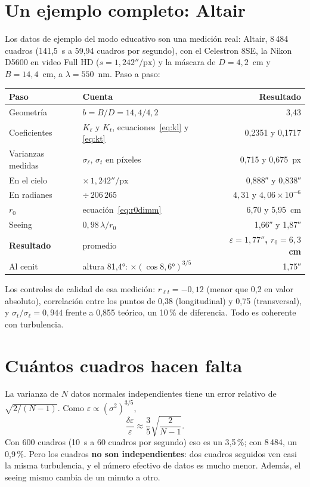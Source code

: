 \section{Un ejemplo completo: Altair}\label{sec:ejemplo_altair}

Los datos de ejemplo del modo educativo son una medición real: Altair, 8\,484 cuadros (141,5~s a 59,94 cuadros por
segundo), con el Celestron 8SE, la Nikon D5600 en video Full HD ($s = 1{,}242''/\text{px}$) y la máscara de
$D = 4{,}2$~cm y $B = 14{,}4$~cm, a $\lambda = 550$~nm. Paso a paso:

\begin{center}\small
\begin{tabular}{@{}l l r@{}}
\toprule
Paso & Cuenta & Resultado\\
\midrule
Geometría & $b = B/D = 14{,}4/4{,}2$ & 3,43\\
Coeficientes & $K_\ell$ y $K_t$, ecuaciones~\eqref{eq:kl} y \eqref{eq:kt} & 0,2351 y 0,1717\\
Varianzas medidas & $\sigma_\ell$, $\sigma_t$ en píxeles & 0,715 y 0,675~px\\
En el cielo & $\times\,1{,}242''/\text{px}$ & 0,888″ y 0,838″\\
En radianes & $\div\,206\,265$ & $4{,}31$ y $4{,}06\times10^{-6}$\\
$r_0$ & ecuación~\eqref{eq:r0dimm} & 6,70 y 5,95~cm\\
Seeing & $0{,}98\,\lambda/r_0$ & 1,66″ y 1,87″\\
\midrule
\textbf{Resultado} & promedio & \textbf{$\varepsilon = 1{,}77''$, $r_0 = 6{,}3$~cm}\\
Al cenit & altura 81,4°: $\times(\cos 8{,}6°)^{3/5}$ & 1,75″\\
\bottomrule
\end{tabular}
\end{center}

Los controles de calidad de esa medición: $r_{\ell t} = -0{,}12$ (menor que 0,2 en valor absoluto), correlación entre
los puntos de 0,38 (longitudinal) y 0,75 (transversal), y $\sigma_t/\sigma_\ell = 0{,}944$ frente a 0,855 teórico, un 10\,\%
de diferencia. Todo es coherente con turbulencia.

\section{Cuántos cuadros hacen falta}\label{sec:incertidumbre}

La varianza de $N$ datos normales independientes tiene un error relativo de $\sqrt{2/(N-1)}$. Como
$\varepsilon \propto (\sigma^2)^{3/5}$,
\begin{equation}
\frac{\delta\varepsilon}{\varepsilon} \approx \frac{3}{5}\sqrt{\frac{2}{N-1}} .
\end{equation}
Con 600 cuadros (10~s a 60 cuadros por segundo) eso es un 3,5\,\%; con 8\,484, un 0,9\,\%. Pero los cuadros
\textbf{no son independientes}: dos cuadros seguidos ven casi la misma turbulencia, y el número efectivo de datos es mucho
menor. Además, el seeing mismo cambia de un minuto a otro.

